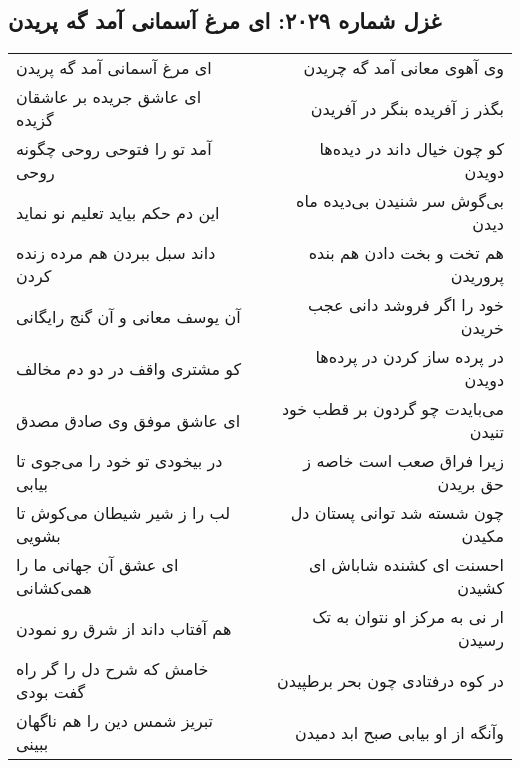 \begin{center}
\section*{غزل شماره ۲۰۲۹: ای مرغ آسمانی آمد گه پریدن}
\label{sec:2029}
\begin{longtable}{l p{0.5cm} r}
ای مرغ آسمانی آمد گه پریدن
&&
وی آهوی معانی آمد گه چریدن
\\
ای عاشق جریده بر عاشقان گزیده
&&
بگذر ز آفریده بنگر در آفریدن
\\
آمد تو را فتوحی روحی چگونه روحی
&&
کو چون خیال داند در دیده‌ها دویدن
\\
این دم حکم بیاید تعلیم نو نماید
&&
بی‌گوش سر شنیدن بی‌دیده ماه دیدن
\\
داند سبل ببردن هم مرده زنده کردن
&&
هم تخت و بخت دادن هم بنده پروریدن
\\
آن یوسف معانی و آن گنج رایگانی
&&
خود را اگر فروشد دانی عجب خریدن
\\
کو مشتری واقف در دو دم مخالف
&&
در پرده ساز کردن در پرده‌ها دویدن
\\
ای عاشق موفق وی صادق مصدق
&&
می‌بایدت چو گردون بر قطب خود تنیدن
\\
در بیخودی تو خود را می‌جوی تا بیابی
&&
زیرا فراق صعب است خاصه ز حق بریدن
\\
لب را ز شیر شیطان می‌کوش تا بشویی
&&
چون شسته شد توانی پستان دل مکیدن
\\
ای عشق آن جهانی ما را همی‌کشانی
&&
احسنت ای کشنده شاباش ای کشیدن
\\
هم آفتاب داند از شرق رو نمودن
&&
ار نی به مرکز او نتوان به تک رسیدن
\\
خامش که شرح دل را گر راه گفت بودی
&&
در کوه درفتادی چون بحر برطپیدن
\\
تبریز شمس دین را هم ناگهان ببینی
&&
وآنگه از او بیابی صبح ابد دمیدن
\\
\end{longtable}
\end{center}
